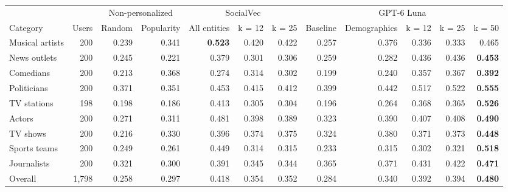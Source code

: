 \begin{tabular}{lrrrrrrrrrrr}
\toprule
 &  & \multicolumn{2}{c}{Non-personalized} & \multicolumn{3}{c}{SocialVec} & \multicolumn{5}{c}{GPT-6 Luna} \\
Category & Users & Random & Popularity & All entities & k = 12 & k = 25 & Baseline & Demographics & k = 12 & k = 25 & k = 50 \\
\midrule
Musical artists & 200 & 0.239 & 0.341 & \textbf{0.523} & 0.420 & 0.422 & 0.257 & 0.376 & 0.336 & 0.333 & 0.465 \\
News outlets & 200 & 0.245 & 0.221 & 0.379 & 0.301 & 0.306 & 0.259 & 0.282 & 0.436 & 0.436 & \textbf{0.453} \\
Comedians & 200 & 0.213 & 0.368 & 0.274 & 0.314 & 0.302 & 0.199 & 0.240 & 0.357 & 0.367 & \textbf{0.392} \\
Politicians & 200 & 0.371 & 0.351 & 0.453 & 0.415 & 0.412 & 0.399 & 0.442 & 0.517 & 0.522 & \textbf{0.555} \\
TV stations & 198 & 0.198 & 0.186 & 0.413 & 0.305 & 0.304 & 0.196 & 0.264 & 0.368 & 0.365 & \textbf{0.526} \\
Actors & 200 & 0.271 & 0.311 & 0.481 & 0.398 & 0.389 & 0.323 & 0.390 & 0.407 & 0.408 & \textbf{0.490} \\
TV shows & 200 & 0.216 & 0.330 & 0.396 & 0.374 & 0.375 & 0.324 & 0.380 & 0.371 & 0.373 & \textbf{0.448} \\
Sports teams & 200 & 0.249 & 0.261 & 0.449 & 0.314 & 0.315 & 0.233 & 0.315 & 0.302 & 0.321 & \textbf{0.518} \\
Journalists & 200 & 0.321 & 0.300 & 0.391 & 0.345 & 0.344 & 0.365 & 0.371 & 0.431 & 0.422 & \textbf{0.471} \\
\midrule
Overall & 1,798 & 0.258 & 0.297 & 0.418 & 0.354 & 0.352 & 0.284 & 0.340 & 0.392 & 0.394 & \textbf{0.480} \\
\bottomrule
\end{tabular}
